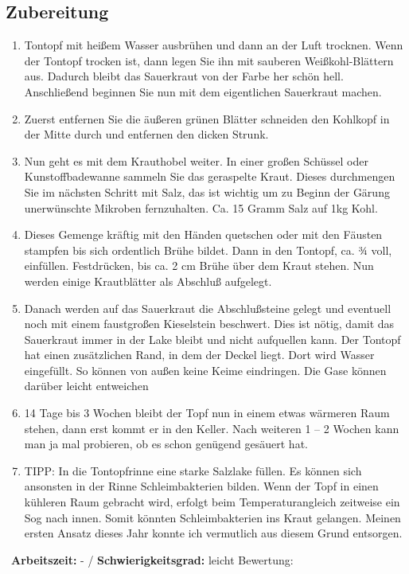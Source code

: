 \begin{minipage}[t]{0.58\textwidth}
\vspace{0pt}
\subsection*{Zubereitung}
\begin{enumerate}[leftmargin=*, itemindent=14pt]


\item Tontopf mit heißem Wasser ausbrühen und dann an der Luft trocknen. Wenn der Tontopf trocken ist, dann legen Sie ihn mit sauberen Weißkohl-Blättern aus. Dadurch bleibt das Sauerkraut von der Farbe her schön hell. Anschließend beginnen Sie nun mit dem eigentlichen Sauerkraut machen.

\item Zuerst entfernen Sie die äußeren grünen Blätter schneiden den Kohlkopf in der Mitte durch und entfernen den dicken Strunk.

\item Nun geht es mit dem Krauthobel weiter. In einer großen Schüssel oder Kunstoffbadewanne sammeln Sie das geraspelte Kraut. Dieses durchmengen Sie im nächsten Schritt mit Salz, das ist wichtig um zu Beginn der Gärung unerwünschte Mikroben fernzuhalten. Ca. 15 Gramm Salz auf 1kg Kohl.

\item Dieses Gemenge kräftig mit den Händen quetschen oder mit den Fäusten stampfen bis sich ordentlich Brühe bildet. Dann in den Tontopf, ca. ¾ voll, einfüllen. Festdrücken, bis ca. 2 cm Brühe über dem Kraut stehen. Nun werden einige Krautblätter als Abschluß aufgelegt.

\item Danach werden auf das Sauerkraut die Abschlußsteine gelegt und eventuell noch mit einem faustgroßen Kieselstein beschwert. Dies ist nötig, damit das Sauerkraut immer in der Lake bleibt und nicht aufquellen kann. Der Tontopf hat einen zusätzlichen Rand, in dem der Deckel liegt. Dort wird Wasser eingefüllt. So können von außen keine Keime eindringen. Die Gase können darüber leicht entweichen

\item 14 Tage bis 3 Wochen bleibt der Topf nun in einem etwas wärmeren Raum stehen, dann erst kommt er in den Keller. Nach weiteren 1 – 2 Wochen kann man ja mal probieren, ob es schon genügend gesäuert hat.

\item TIPP: In die Tontopfrinne eine starke Salzlake füllen. Es können sich ansonsten in der Rinne Schleimbakterien bilden. Wenn der Topf in einen kühleren Raum gebracht wird, erfolgt beim Temperaturangleich zeitweise ein Sog nach innen. Somit könnten Schleimbakterien ins Kraut gelangen. Meinen ersten Ansatz dieses Jahr konnte ich vermutlich aus diesem Grund entsorgen.
    
\end{enumerate}
\end{minipage}
\vfill
\decothreeright \, \textbf{Arbeitszeit:} - / \textbf{Schwierigkeitsgrad:} leicht \decothreeleft \hfill Bewertung: \Circle  \Circle \Circle  \Circle \Circle